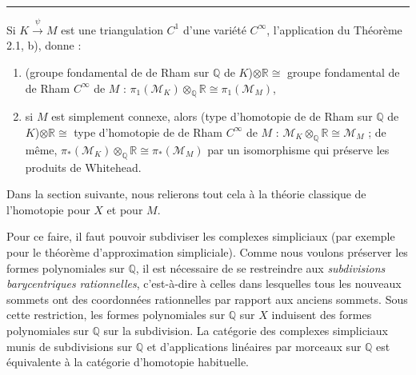 \documentclass[
  french,
  a3paper,
  a3paper]{extarticle}
\begin{document}
\clearpage



\par

\vspace{0.7mm}\hrule\vspace{1.6mm}

\fontsize{9}{11}\selectfont

Si \(K\xrightarrow{\psi}M\) est une triangulation \(C^1\) d'une variété
\(C^\infty\), l'application du Théorème 2.1, b), donne :

\begin{enumerate}
\def\labelenumi{\arabic{enumi})}
\item
  (groupe fondamental de de Rham sur \(\mathbb Q\) de
  \(K\))\(\otimes\mathbb R\cong\) groupe fondamental de de Rham
  \(C^\infty\) de \(M\) :
  \(\pi_1(\mathcal M_K)\otimes_{\mathbb Q}\mathbb R\cong\pi_1(\mathcal M_M)\),
\item
  si \(M\) est simplement connexe, alors (type d'homotopie de de Rham
  sur \(\mathbb Q\) de \(K\))\(\otimes\mathbb R\cong\) type d'homotopie
  de de Rham \(C^\infty\) de \(M\) :
  \(\mathcal M_K\otimes_{\mathbb Q}\mathbb R\cong\mathcal M_M\) ; de
  même,
  \(\pi_*(\mathcal M_K)\otimes_{\mathbb Q}\mathbb R\cong\pi_*(\mathcal M_M)\)
  par un isomorphisme qui préserve les produits de Whitehead.
\end{enumerate}

Dans la section suivante, nous relierons tout cela à la théorie
classique de l'homotopie pour \(X\) et pour \(M\).

Pour ce faire, il faut pouvoir subdiviser les complexes simpliciaux (par
exemple pour le théorème d'approximation simpliciale). Comme nous
voulons préserver les formes polynomiales sur \(\mathbb Q\), il est
nécessaire de se restreindre aux \emph{subdivisions barycentriques
rationnelles}, c'est-à-dire à celles dans lesquelles tous les nouveaux
sommets ont des coordonnées rationnelles par rapport aux anciens
sommets. Sous cette restriction, les formes polynomiales sur
\(\mathbb Q\) sur \(X\) induisent des formes polynomiales sur
\(\mathbb Q\) sur la subdivision. La catégorie des complexes simpliciaux
munis de subdivisions sur \(\mathbb Q\) et d'applications linéaires par
morceaux sur \(\mathbb Q\) est équivalente à la catégorie d'homotopie
habituelle.
\end{document}
